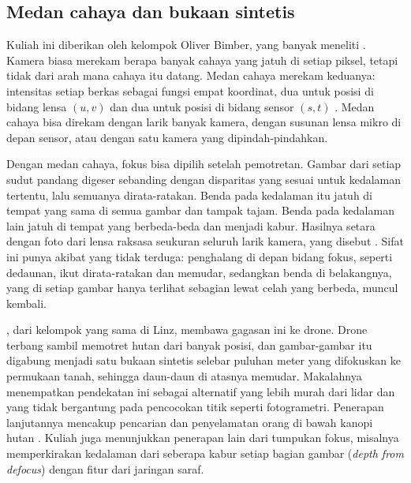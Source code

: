 \subsection{Medan cahaya dan bukaan sintetis}

Kuliah ini diberikan oleh kelompok Oliver Bimber, yang banyak meneliti . Kamera biasa merekam berapa banyak
cahaya yang jatuh di setiap piksel, tetapi tidak dari arah mana cahaya itu datang. Medan cahaya merekam keduanya: intensitas
setiap berkas sebagai fungsi empat koordinat, dua untuk posisi di bidang lensa $(u,v)$ dan dua untuk posisi di bidang sensor
$(s,t)$ \citep{levoy1996}. Medan cahaya bisa direkam dengan larik banyak kamera, dengan susunan lensa mikro di depan sensor,
atau dengan satu kamera yang dipindah-pindahkan.

Dengan medan cahaya, fokus bisa dipilih setelah pemotretan. Gambar dari setiap sudut pandang digeser sebanding dengan
disparitas yang sesuai untuk kedalaman tertentu, lalu semuanya dirata-ratakan. Benda pada kedalaman itu jatuh di tempat yang
sama di semua gambar dan tampak tajam. Benda pada kedalaman lain jatuh di tempat yang berbeda-beda dan menjadi kabur. Hasilnya
setara dengan foto dari lensa raksasa seukuran seluruh larik kamera, yang disebut . Sifat ini punya
akibat yang tidak terduga: penghalang di depan bidang fokus, seperti dedaunan, ikut dirata-ratakan dan memudar, sedangkan benda di
belakangnya, yang di setiap gambar hanya terlihat sebagian lewat celah yang berbeda, muncul kembali.

 \citep{kurmi2018}, dari kelompok yang sama di Linz, membawa gagasan ini ke drone. Drone terbang
sambil memotret hutan dari banyak posisi, dan gambar-gambar itu digabung menjadi satu bukaan sintetis selebar puluhan meter
yang difokuskan ke permukaan tanah, sehingga daun-daun di atasnya memudar. Makalahnya menempatkan pendekatan ini sebagai
alternatif yang lebih murah dari lidar dan yang tidak bergantung pada pencocokan titik seperti fotogrametri. Penerapan
lanjutannya mencakup pencarian dan penyelamatan orang di bawah kanopi hutan \citep{schedl2020}. Kuliah juga menunjukkan
penerapan lain dari tumpukan fokus, misalnya memperkirakan kedalaman dari seberapa kabur setiap bagian gambar
(\emph{depth from defocus}) dengan fitur dari jaringan saraf.

